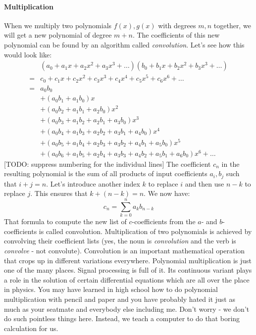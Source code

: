 \paragraph{Multiplication}
When we multiply two polynomials $f(x), g(x)$ with degrees $m,n$ together, we will get a new polynomial of degree $m+n$. The coefficients of this new polynomial can be found by an algorithm called \emph{convolution}. Let's see how this would look like:
\begin{eqnarray}
&  (a_0 + a_1 x + a_2 x^2 + a_3 x^3 + \ldots)
   (b_0 + b_1 x + b_2 x^2 + b_3 x^3 + \ldots)  \\
=&  c_0 + c_1 x + c_2 x^2 + c_3 x^3 + c_4 x^4 + c_5 x^5 + c_6 x^6 + \ldots \\
=&  a_0 b_0 \\
&+ (a_0 b_1 + a_1 b_0) x \\
&+ (a_0 b_2 + a_1 b_1 + a_2 b_0) x^2 \\
&+ (a_0 b_3 + a_1 b_2 + a_2 b_1 + a_3 b_0) x^3  \\
&+ (a_0 b_4 + a_1 b_3 + a_2 b_2 + a_3 b_1 + a_4 b_0) x^4 \\
&+ (a_0 b_5 + a_1 b_4 + a_2 b_3 + a_3 b_2 + a_4 b_1 + a_5 b_0) x^5 \\
&+ (a_0 b_6 + a_1 b_5 + a_2 b_4 + a_3 b_3 + a_4 b_2 + a_5 b_1 + a_6 b_0) x^6 + \ldots
\end{eqnarray}
[TODO: suppress numbering for the individual lines] \newline
The coefficient $c_n$ in the resulting polynomial is the sum of all products of input coefficients $a_i, b_j$ such that $i+j = n$. Let's introduce another index $k$ to replace $i$ and then use $n-k$ to replace $j$. This ensures that $k + (n-k) = n$. We now have:
\begin{equation}
  c_n = \sum_{k=0}^n a_k b_{n-k}
\end{equation}
That formula to compute the new list of $c$-coefficients from the $a$- and $b$-coefficients is called convolution. Multiplication of two polynomials is achieved by convolving their coefficient lists (yes, the noun is \emph{convolution} and the verb is \emph{convolve} - not convolute). Convolution is an important mathematical operation that crops up in different variations everywhere. Polynomial multiplication is just one of the many places. Signal processing is full of it. Its continuous variant plays a role in the solution of certain differential equations which are all over the place in physics. You may have learned in high school how to do polynomial multiplication with pencil and paper and you have probably hated it just as much as your seatmate and everybody else including me. Don't worry - we don't do such pointless things here. Instead, we teach a computer to do that boring calculation for us.

